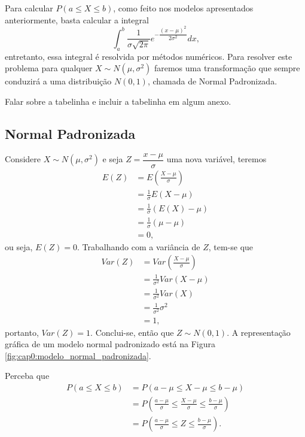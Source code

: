 Para calcular $P(a\leqslant X\leqslant b)$, como feito nos modelos apresentados anteriormente, basta calcular a integral
\[
	\int_{a}^{b}
		\dfrac{1}{\sigma\sqrt{2\pi}}
		e^{
			-\dfrac{(x-\mu)^2}{2\sigma^2}
		}
	dx
	\text{,}
\]
entretanto, essa integral é resolvida por métodos numéricos. Para resolver este problema para qualquer $X\sim N(\mu,\sigma^2)$ faremos uma transformação que sempre conduzirá a uma distribuição $N(0, 1)$, chamada de Normal Padronizada.

{\color{red}Falar sobre a tabelinha e incluir a tabelinha em algum anexo.}

\subsection{Normal Padronizada}

Considere $X\sim N(\mu,\sigma^2)$ e seja $Z=\dfrac{x-\mu}{\sigma}$ uma nova variável, teremos
\begin{align*}
	E(Z)&=E\left(\frac{X-\mu}{\sigma} \right )\\
		&=\frac{1}{\sigma}E(X-\mu)\\
		&=\frac{1}{\sigma}(E(X)-\mu)\\
		&=\frac{1}{\sigma}(\mu-\mu)\\
		&=0\text{,}
\end{align*}
ou seja, $E(Z)=0$. Trabalhando com a variância de $Z$, tem-se que
\begin{align*}
	Var(Z)&=Var\left( \frac{X-\mu}{\sigma} \right )\\
		  &=\frac{1}{\sigma^2}Var(X-\mu)\\
		  &=\frac{1}{\sigma^2}Var(X)\\
		  &=\frac{1}{\sigma^2}\sigma^2\\
		  &=1\text{,}
\end{align*}
portanto, $Var(Z)=1$. Conclui-se, então que $Z\sim N(0,1)$. A representação gráfica de um modelo normal padronizado está na Figura \ref{fig:cap0:modelo_normal_padronizada}.

\begin{remark}
	Perceba que
	\begin{align*}
		P(a\leqslant X \leqslant b)&=P(a-\mu \leqslant X-\mu \leqslant b-\mu)\\
									&=P\left(\frac{a-\mu}{\sigma}\leqslant \frac{X-\mu}{\sigma} \leqslant \frac{b-\mu}{\sigma}\right )\\
									&=P\left(\frac{a-\mu}{\sigma}\leqslant Z \leqslant \frac{b-\mu}{\sigma} \right )\text{.}
	\end{align*}
\end{remark}

